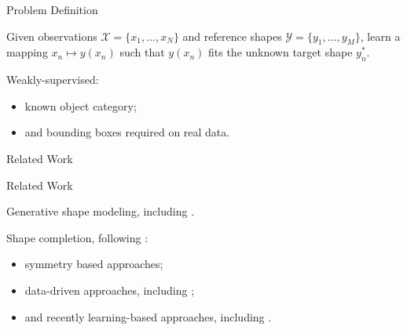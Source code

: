 \documentclass[22pt,table]{beamer}
\makeatletter
\newcommand{\Scriptsize}{\@setfontsize\Scriptsize{9}{12.5}}
\makeatother
\begin{document}
\begin{frame}[t]
\begin{center}
    \end{center}
  \end{frame}
  
  \begin{frame}[t]
    {\large Problem Definition}
    
    \begin{problem}
      \small
      Given
      observations $\mathcal{X} = \{x_1, \ldots, x_N\}$
      and
      reference shapes $\mathcal{Y} = \{y_1, \ldots, y_M\}$,
      learn a mapping $x_n \mapsto y(x_n)$
      such that $y(x_n)$ fits the 
      {\color{RWTHred}unknown target shape $y_n^*$}.
    \end{problem}
    
    Weakly-supervised: 
    \begin{itemize}
      \item known object category;
      \item and bounding boxes required on real data.
    \end{itemize}
  \end{frame}
  
  \begin{frame}
    \begin{center}
      {\Large Related Work}
    \end{center}
  \end{frame}
  
  \begin{frame}
    {\large Related Work}
    
    Generative shape modeling, including \cite{WuSongXiao:2015,WuTenenbaum:2016}.
    \pause
    \vspace{1em}
    
    Shape completion, following \cite{SungAngstGuibas:2015}:
    \begin{itemize}
      \item symmetry based approaches;
      \item data-driven approaches, including 
      \cite{DameReid:2013,EngelmannStuecklerLeibe:2016};
      \item and recently learning-based approaches, including
      \cite{DaiNiessner:2016}.
    \end{itemize}
  \end{frame}
  
\end{document}
